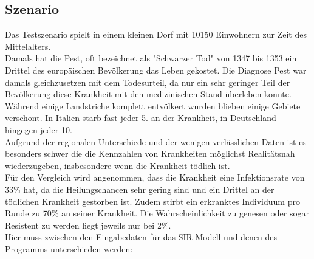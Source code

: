 \documentclass[10pt,twocolumn]{scrartcl}
\begin{document}
\subsection*{Szenario}
Das Testszenario spielt in einem kleinen Dorf mit 10150 Einwohnern zur Zeit des Mittelalters.\\
Damals hat die Pest, oft bezeichnet als "Schwarzer Tod" von 1347 bis 1353 ein Drittel des europäischen Bevölkerung das Leben gekostet. Die Diagnose Pest war damals gleichzusetzen mit dem Todesurteil, da nur ein sehr geringer Teil der Bevölkerung diese Krankheit mit den medizinischen Stand überleben konnte. Während einige Landstriche komplett entvölkert wurden blieben einige Gebiete verschont. In Italien starb fast jeder 5. an der Krankheit, in Deutschland hingegen jeder 10.\\
Aufgrund der regionalen Unterschiede und der wenigen verlässlichen Daten ist es besonders schwer die die Kennzahlen von Krankheiten möglichst Realitätsnah wiederzugeben, insbesondere wenn die Krankheit tödlich ist.\\
Für den Vergleich wird angenommen, dass die Krankheit eine Infektionsrate von 33\% hat, da die Heilungschancen sehr gering sind und ein Drittel an der tödlichen Krankheit gestorben ist.\cite{} Zudem stirbt ein erkranktes Individuum pro Runde zu 70\% an seiner Krankheit. Die Wahrscheinlichkeit zu genesen oder sogar Resistent zu werden liegt jeweils nur bei 2\%.\cite{}\\
Hier muss zwischen den Eingabedaten für das SIR-Modell und denen des Programms unterschieden werden:
\end{document}
